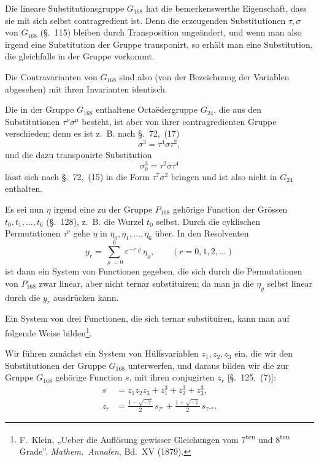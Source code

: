 \documentclass[12pt,a4paper]{article}
\theoremstyle{definition}
\begin{document}
Die lineare Substitutionsgruppe $G_{168}$ hat die bemerkenswerthe Eigenschaft, dass sie mit sich selbst contragredient ist. Denn die erzeugenden Substitutionen $\tau,\sigma$ von $G_{168}$ (\S.~115) bleiben durch Transposition ungeändert, und wenn man also irgend eine Substitution der Gruppe transponirt, so erhält man eine Substitution, die gleichfalls in der Gruppe vorkommt.

Die Contravarianten von $G_{168}$ sind also (von der Bezeichnung der Variablen abgesehen) mit ihren Invarianten identisch.

Die in der Gruppe $G_{168}$ enthaltene Octaëdergruppe $G_{24}$, die aus den Substitutionen $\tau^{\nu}\sigma^{\mu}$ besteht, ist aber von ihrer contragredienten Gruppe verschieden; denn es ist z.~B. nach \S.~72,~(17)
\[
\sigma^3 = \tau^4\sigma\tau^2,
\]
und die dazu transponirte Substitution
\[
\sigma_0^3 = \tau^2\sigma\tau^4
\]
lässt sich nach \S.~72,~(15) in die Form $\tau^7\sigma^2$ bringen und ist also nicht in $G_{24}$ enthalten.

Es sei nun $\eta$ irgend eine zu der Gruppe $P_{168}$ gehörige Function der Grössen $t_0,t_1,\dots,t_6$ (\S.~128), z.~B. die Wurzel $t_0$ selbst. Durch die cyklischen Permutationen $\tau^{\nu}$ gehe $\eta$ in $\eta_0,\eta_1,\dots,\eta_6$ über. In den Resolventen
\begin{equation}\label{eq:resolventen}
y_r = \sum_{\varrho=0}^{6} \varepsilon^{-r\varrho}\eta_{\varrho},
\qquad (r=0,1,2,\dots)
\end{equation}
ist dann ein System von Functionen gegeben, die sich durch die Permutationen von $P_{168}$ zwar linear, aber nicht ternar substituiren; da man ja die $\eta_{\varrho}$ selbst linear durch die $y_r$ ausdrücken kann.

\newpage

Ein System von drei Functionen, die sich ternar substituiren, kann man auf folgende Weise bilden\footnote{F.~Klein, „Ueber die Auflösung gewisser Gleichungen vom 7\textsuperscript{ten} und 8\textsuperscript{ten} Grade''. \textit{Mathem.\ Annalen}, Bd.~XV (1879).}.

Wir führen zunächst ein System von Hülfsvariablen $z_1,z_2,z_3$ ein, die wir den Substitutionen der Gruppe $G_{168}$ unterwerfen, und daraus bilden wir die zur Gruppe $G_{168}$ gehörige Function $s$, mit ihren conjugirten $z_r$ [\S.~125,~(7)]:
\begin{equation}\label{eq:2}
\begin{aligned}
s &= z_1z_2z_3 + z_1^3 + z_2^3 + z_3^3,\\
z_r &= \frac{1-\sqrt{-7}}{2}\,s_{\tau^r} + \frac{1+\sqrt{-7}}{2}\,s_{\tau^{-r}}.
\end{aligned}
\end{equation}
\end{document}
